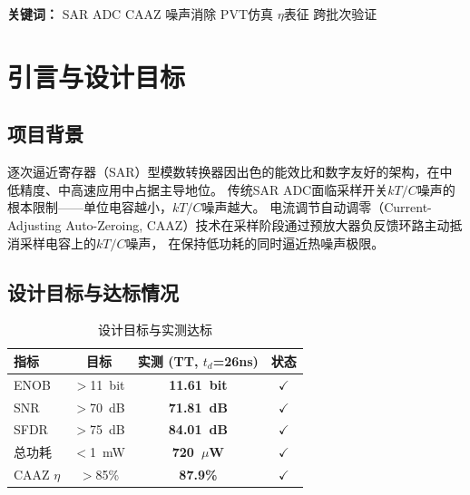 \documentclass[11pt,a4paper,UTF8]{ctexart}
\newcommand{\keydata}[1]{\textbf{\color{primaryblue}#1}}
\begin{document}
\begin{titlepage}
\begin{center}
\vfill
{\small\textbf{关键词：} SAR ADC \hspace{1em} CAAZ \hspace{1em} 噪声消除 \hspace{1em} PVT仿真 \hspace{1em} $\eta$表征 \hspace{1em} 跨批次验证}
\end{center}
\end{titlepage}

\tableofcontents
\newpage

\section{引言与设计目标}
\label{sec:intro}

\subsection{项目背景}

逐次逼近寄存器（SAR）型模数转换器因出色的能效比和数字友好的架构，在中低精度、中高速应用中占据主导地位。
传统SAR ADC面临采样开关$kT/C$噪声的根本限制——单位电容越小，$kT/C$噪声越大。
电流调节自动调零（Current-Adjusting Auto-Zeroing, CAAZ）技术在采样阶段通过预放大器负反馈环路主动抵消采样电容上的$kT/C$噪声，
在保持低功耗的同时逼近热噪声极限。

\subsection{设计目标与达标情况}

\begin{table}[htbp]
\centering
\caption{设计目标与实测达标}
\label{tab:targets}
\begin{tabular}{lccc}
\toprule
\textbf{指标} & \textbf{目标} & \textbf{实测 (TT, $t_d$=26ns)} & \textbf{状态} \\
\midrule
ENOB & $>$11~bit & \keydata{11.61~bit} & $\checkmark$ \\
SNR & $>$70~dB & \keydata{71.81~dB} & $\checkmark$ \\
SFDR & $>$75~dB & \keydata{84.01~dB} & $\checkmark$ \\
总功耗 & $<$1~mW & \keydata{720~$\mu$W} & $\checkmark$ \\
CAAZ $\eta$ & $>$85\% & \keydata{87.9\%} & $\checkmark$ \\
\bottomrule
\end{tabular}
\end{table}
\end{document}
